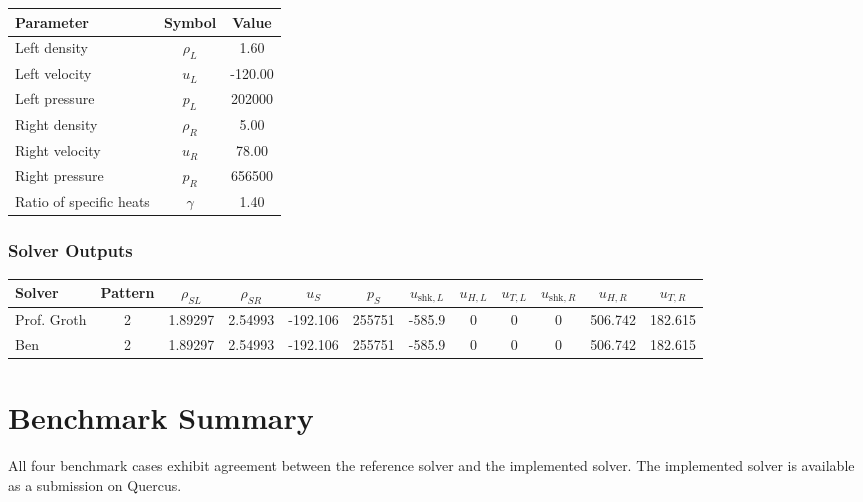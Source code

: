 \documentclass[11pt,landscape]{article}
\begin{document}
\begin{center}
\begin{tabular}{lcc}
\toprule
Parameter & Symbol & Value \\
\midrule
Left density & $\rho_L$ & 1.60 \\
Left velocity & $u_L$ & -120.00 \\
Left pressure & $p_L$ & 202000 \\
Right density & $\rho_R$ & 5.00 \\
Right velocity & $u_R$ & 78.00 \\
Right pressure & $p_R$ & 656500 \\
Ratio of specific heats & $\gamma$ & 1.40 \\
\bottomrule
\end{tabular}
\end{center}

\subsubsection*{Solver Outputs}

\begin{center}
\small
\begin{tabular}{lccccccccccc}
\toprule
Solver & Pattern & $\rho_{SL}$ & $\rho_{SR}$ & $u_S$ & $p_S$
& $u_{\mathrm{shk},L}$ & $u_{H,L}$ & $u_{T,L}$
& $u_{\mathrm{shk},R}$ & $u_{H,R}$ & $u_{T,R}$ \\
\midrule
Prof. Groth & 2 & 1.89297 & 2.54993 & -192.106 & 255751
& -585.9 & 0 & 0 & 0 & 506.742 & 182.615 \\

Ben & 2 & 1.89297 & 2.54993 & -192.106 & 255751
& -585.9 & 0 & 0 & 0 & 506.742 & 182.615 \\
\bottomrule
\end{tabular}
\end{center}

\section*{Benchmark Summary}

All four benchmark cases exhibit agreement between the reference solver and the implemented solver. The implemented solver is available as a submission on Quercus.
\end{document}
